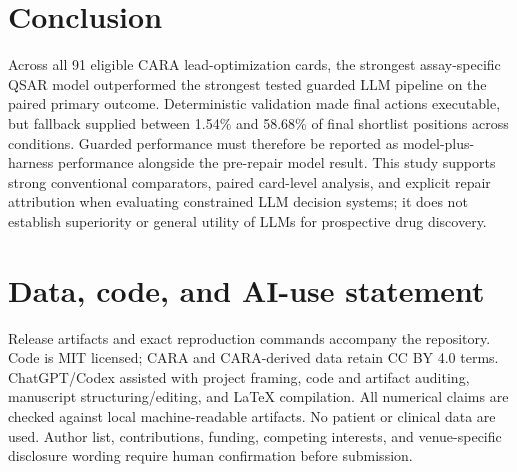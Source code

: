 \documentclass[10pt,a4paper]{article}
\begin{document}
\section{Conclusion}

Across all 91 eligible CARA lead-optimization cards, the strongest
assay-specific QSAR model outperformed the strongest tested guarded LLM
pipeline on the paired primary outcome. Deterministic validation made final
actions executable, but fallback supplied between 1.54\% and 58.68\% of final
shortlist positions across conditions. Guarded performance must therefore be
reported as model-plus-harness performance alongside the pre-repair model
result. This study supports strong conventional comparators, paired card-level
analysis, and explicit repair attribution when evaluating constrained LLM
decision systems; it does not establish superiority or general utility of LLMs
for prospective drug discovery.

\section*{Data, code, and AI-use statement}

Release artifacts and exact reproduction commands accompany the repository.
Code is MIT licensed; CARA and CARA-derived data retain CC BY 4.0
terms. ChatGPT/Codex assisted with project framing, code and artifact auditing,
manuscript structuring/editing, and LaTeX compilation. All numerical claims are
checked against local machine-readable artifacts. No patient or clinical data
are used. Author list, contributions, funding, competing interests, and
venue-specific disclosure wording require human confirmation before submission.

\begingroup
\small


\endgroup
\end{document}
